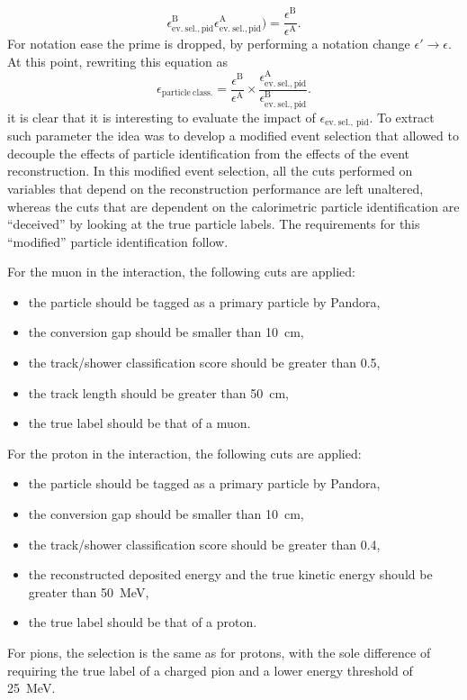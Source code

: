 \begin{equation}
{    \epsilon_\mathrm{ev.\ sel., pid}^\mathrm{B}
    }{
    \epsilon_\mathrm{ev.\ sel., pid}^\mathrm{A}
    }) = \frac{
    \epsilon^\mathrm{B}
    }{
    \epsilon^\mathrm{A}
    }. 
\end{equation} For notation ease the prime is dropped, by performing a notation change $\epsilon' \to \epsilon$. At this point, rewriting this equation as \begin{equation}
    \epsilon_\mathrm{particle\ class.} = \frac{
    \epsilon^\mathrm{B}
    }{
    \epsilon^\mathrm{A}
    } \times \frac{
    \epsilon_\mathrm{ev.\ sel., pid}^\mathrm{A}
    }{
    \epsilon_\mathrm{ev.\ sel., pid}^\mathrm{B}
    }. \label{eq:stageEfficiencyPostPID}
\end{equation} it is clear that it is interesting to evaluate the impact of $\epsilon_\mathrm{ev.\ sel.,\ pid}$. To extract such parameter the idea was to develop a modified event selection that allowed to decouple the effects of particle identification from the effects of the event reconstruction. In this modified event selection, all the cuts performed on variables that depend on the reconstruction performance are left unaltered, whereas the cuts that are dependent on the calorimetric particle identification are ``deceived'' by looking at the true particle labels. The requirements for this ``modified'' particle identification follow.  

\noindent
For the muon in the interaction, the following cuts are applied: \begin{itemize}
    \item the particle should be tagged as a primary particle by Pandora,
    \item the conversion gap should be smaller than \SI{10}{\cm},
    \item the track/shower classification score should be greater than 0.5,
    \item the track length should be greater than \SI{50}{\cm},
    \item the true label should be that of a muon. 
\end{itemize}
For the proton in the interaction, the following cuts are applied: \begin{itemize}
    \item the particle should be tagged as a primary particle by Pandora,
    \item the conversion gap should be smaller than \SI{10}{\cm},
    \item the track/shower classification score should be greater than 0.4,
    \item the reconstructed deposited energy and the true kinetic energy should be greater than \SI{50}{\MeV},
    \item the true label should be that of a proton.
\end{itemize}
For pions, the selection is the same as for protons, with the sole difference of requiring the true label of a charged pion and a lower energy threshold of \SI{25}{\MeV}. 

